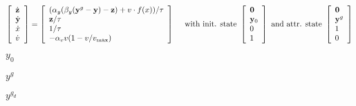 \documentclass{article}
\begin{document}
\begin{eqnarray*} \left[ \begin{array}{l} {\dot{\mathbf{z}}} \\ {\dot{\mathbf{y}}} \\ {\dot{x}} \\ {\dot{v}} \end{array} \right] = \left[ \begin{array}{l} (\alpha_y (\beta_y({\mathbf{y}}^{g}-\mathbf{y})-\mathbf{z}) + v\cdot f(x))/\tau \\ \mathbf{z}/\tau \\ 1/\tau \\ -\alpha_v v (1-v/v_{\mbox{\scriptsize max}}) \end{array} \right] \mbox{~~~~with init. state~} \left[ \begin{array}{l} \mathbf{0} \\ \mathbf{y}_0 \\ 0 \\ 1 \end{array} \right] \mbox{~and attr. state~} \left[ \begin{array}{l} \mathbf{0} \\ \mathbf{y}^g \\ 1 \\ 0 \end{array} \right] \end{eqnarray*}
\pagebreak

$ y_0 $
\pagebreak

$ y^g $
\pagebreak

$ y^{g_d} $
\pagebreak
\end{document}
